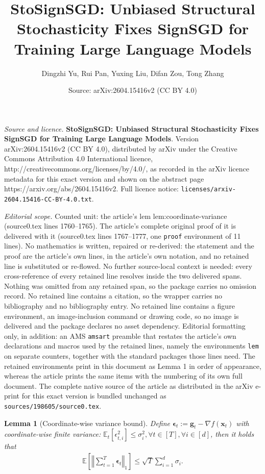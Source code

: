\documentclass[10pt,a4paper]{amsart}
\title{\textbf{StoSignSGD: Unbiased Structural Stochasticity Fixes SignSGD for Training Large Language Models}}
\author{Dingzhi Yu, Rui Pan, Yuxing Liu, Difan Zou, Tong Zhang}
\date{Source: arXiv:2604.15416v2 (CC BY 4.0)}
\newtheorem{lem}{Lemma}
\def \E {\mathbb{E}}
\def \eps {\bm{\epsilon}}
\def \g {\mathbf{g}}
\newcommand{\norm}[1]{\left\Vert#1\right\Vert}
\newcommand{\sqbrac}[1]{\left[#1\right]}
\def \x {\mathbf{x}}
\begin{document}
\maketitle

\noindent\emph{Source and licence.} \textbf{StoSignSGD: Unbiased Structural Stochasticity Fixes SignSGD for Training Large Language Models}. Version arXiv:2604.15416v2 (CC BY 4.0), distributed by arXiv under the Creative Commons Attribution 4.0 International licence, http://creativecommons.org/licenses/by/4.0/, as recorded in the arXiv licence metadata for this exact version and shown on the abstract page https://arxiv.org/abs/2604.15416v2. Full licence notice: \texttt{licenses/arxiv-2604.15416-CC-BY-4.0.txt}.\par\smallskip

\noindent\textit{Editorial scope.} Counted unit: the article's lem lem:coordinate-variance (source0.tex lines 1760--1765). The article's complete original proof of it is delivered with it (source0.tex lines 1767--1777, one \texttt{proof} environment of 11 lines). No mathematics is written, repaired or re-derived: the statement and the proof are the article's own lines, in the article's own notation, and no retained line is substituted or re-flowed.  No further source-local context is needed: every cross-reference of every retained line resolves inside the two delivered spans.  Nothing was omitted from any retained span, so the package carries no omission record.  No retained line contains a citation, so the wrapper carries no bibliography and no bibliography entry.  No retained line contains a figure environment, an image-inclusion command or drawing code, so no image is delivered and the package declares no asset dependency.  Editorial formatting only, in addition: an AMS \texttt{amsart} preamble that restates the article's own declarations and macros used by the retained lines, namely the environments \texttt{lem} on separate counters, together with the standard packages those lines need.  The retained environments print in this document as Lemma 1 in order of appearance, whereas the article prints the same items with the numbering of its own full document.  The complete native source of the article as distributed in the arXiv e-print for this exact version is bundled unchanged as \texttt{sources/198605/source0.tex}.
\begin{lem}[Coordinate-wise variance bound]\label{lem:coordinate-variance}
    Define $\eps_t:=\g_t-\nabla f(\x_t)$ with coordinate-wise finite variance: $\E_t[\epsilon_{t,i}^2]\le\sigma_i^2,\forall t\in[T],\forall i\in[d]$, then it holds that
    \begin{align*}
        \E\sqbrac{\norm{\sum_{t=1}^T\eps_t}_1}\le\sqrt{T}\sum_{i=1}^d\sigma_i.
    \end{align*}
\end{lem}
\end{document}
